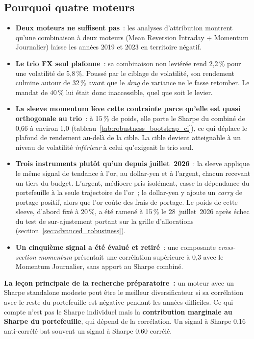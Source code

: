 \subsection{Pourquoi quatre moteurs}

\begin{itemize}
\item \textbf{Deux moteurs ne suffisent pas}~: les analyses d'attribution montrent qu'une combinaison à deux moteurs (Mean Reversion Intraday + Momentum Journalier) laisse les années 2019 et 2023 en territoire négatif.
\item \textbf{Le trio FX seul plafonne}~: sa combinaison non leviérée rend 2,2\,\% pour une volatilité de 5,8\,\%. Poussé par le ciblage de volatilité, son rendement culmine autour de 32\,\% avant que le \emph{drag} de variance ne le fasse retomber. Le mandat de 40\,\% lui était donc inaccessible, quel que soit le levier.
\item \textbf{La sleeve momentum lève cette contrainte parce qu'elle est quasi orthogonale au trio}~: à 15\,\% de poids, elle porte le Sharpe du combiné de 0,66 à environ 1,0 (tableau~\ref{tab:robustness_bootstrap_ci}), ce qui déplace le plafond de rendement au-delà de la cible. La cible devient atteignable à un niveau de volatilité \emph{inférieur} à celui qu'exigeait le trio seul.
\item \textbf{Trois instruments plutôt qu'un depuis juillet~2026}~: la sleeve applique le même signal de tendance à l'or, au dollar-yen et à l'argent, chacun recevant un tiers du budget. L'argent, médiocre pris isolément, casse la dépendance du portefeuille à la seule trajectoire de l'or~; le dollar-yen y ajoute un \emph{carry} de portage positif, alors que l'or coûte des frais de portage. Le poids de cette sleeve, d'abord fixé à 20\,\%, a été ramené à 15\,\% le 28~juillet~2026 après échec du test de sur-ajustement portant sur la grille d'allocations (section~\ref{sec:advanced_robustness}).
\item \textbf{Un cinquième signal a été évalué et retiré}~: une composante \emph{cross-section momentum} présentait une corrélation supérieure à 0,3 avec le Momentum Journalier, sans apport au Sharpe combiné.
\end{itemize}

\begin{insightbox}
\textbf{La leçon principale de la recherche préparatoire~:} un moteur avec un Sharpe standalone modeste peut être le meilleur diversificateur si sa corrélation avec le reste du portefeuille est négative pendant les années difficiles. Ce qui compte n'est pas le Sharpe individuel mais la \textbf{contribution marginale au Sharpe du portefeuille}, qui dépend de la corrélation. Un signal à Sharpe 0.16 anti-corrélé bat souvent un signal à Sharpe 0.60 corrélé.
\end{insightbox}

